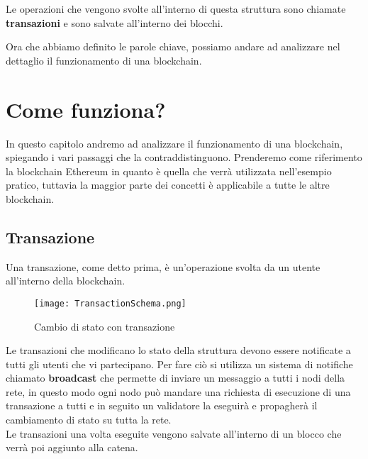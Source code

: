 Le operazioni che vengono svolte all'interno di questa struttura sono chiamate
\textbf{transazioni} e sono salvate all'interno dei blocchi.

Ora che abbiamo definito le parole chiave, possiamo andare ad analizzare nel 
dettaglio il funzionamento di una blockchain.

\section{Come funziona?}
In questo capitolo andremo ad analizzare il funzionamento di una blockchain,
spiegando i vari passaggi che la contraddistinguono. Prenderemo come
riferimento la blockchain Ethereum in quanto è quella che verrà utilizzata
nell'esempio pratico, tuttavia la maggior parte dei concetti è applicabile 
a tutte le altre blockchain.

\subsection{Transazione}
Una transazione, come detto prima, è un'operazione svolta da un utente
all'interno della blockchain. 

\begin{figure}[H]
    \centering
    \texttt{[image: TransactionSchema.png]} 
    \caption{Cambio di stato con transazione}
    \label{fig:transactionSchema}
\end{figure}

Le transazioni che modificano lo stato della struttura devono essere notificate
a tutti gli utenti che vi partecipano. Per fare ciò si utilizza un sistema di
notifiche chiamato \textbf{broadcast} che permette di inviare un messaggio a
tutti i nodi della rete, in questo modo ogni nodo può mandare una richiesta di
esecuzione di una transazione a tutti e in seguito un validatore la eseguirà e
propagherà il cambiamento di stato su tutta la rete. \\
Le transazioni una volta eseguite vengono salvate all'interno di un blocco che
verrà poi aggiunto alla catena.

